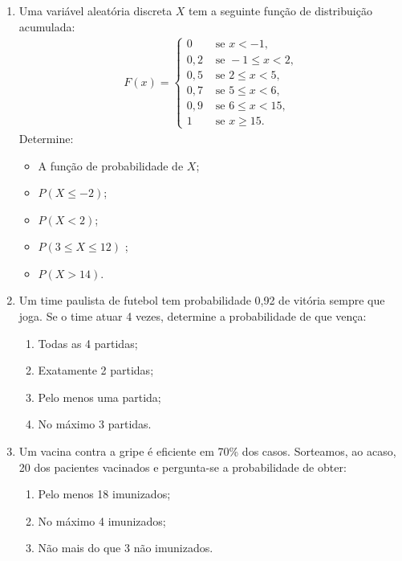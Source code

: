 \documentclass[12pt, a4paper]{article}
\begin{document}
\begin{enumerate}
\item Uma variável aleatória discreta $X$ tem a seguinte função de distribuição acumulada:
\begin{align*}
F(x) = \begin{cases}
0 & \mbox{ se } x < -1,\\
0,2 & \mbox{ se } -1 \leq x < 2,\\
0,5 & \mbox{ se } 2 \leq x < 5,\\
0,7 & \mbox{ se } 5 \leq x < 6,\\
0,9 & \mbox{ se } 6 \leq x < 15,\\
1 & \mbox{ se } x \geq 15.
\end{cases}
\end{align*}
Determine:
\begin{itemize}
	\item A função de probabilidade de $X$;
	\item $P(X \leq -2)$;
	\item $P(X < 2)$;
	\item $P(3 \leq X \leq 12)$ ;
	\item $P(X  > 14)$.
\end{itemize}

\item Um time paulista de futebol tem probabilidade 0,92 de vitória sempre que joga. Se o time atuar 4 vezes, determine a probabilidade de que vença:
\begin{enumerate}
	\item Todas as 4 partidas;
	\item Exatamente 2 partidas;
	\item Pelo menos uma partida;
	\item No máximo 3 partidas.
\end{enumerate}

\item Um vacina contra a gripe é eficiente em 70\% dos casos. Sorteamos, ao acaso, 20 dos pacientes vacinados e pergunta-se a probabilidade de obter:
\begin{enumerate}
	\item Pelo menos 18 imunizados;
	\item No máximo 4 imunizados;
	\item Não mais do que 3 não imunizados.
\end{enumerate}


\end{enumerate}
\end{document}
